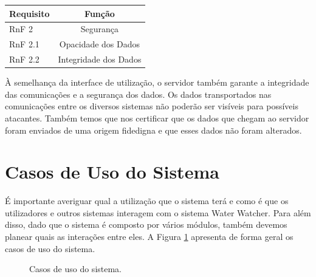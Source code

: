 \vspace{2cm}

\begin{center}
\begin{tabular}[c]{l c} 
\hline
Requisito & Função\\ %
\hline
RnF 2 & Segurança\\ 

RnF 2.1 & Opacidade dos Dados\\

RnF 2.2 & Integridade dos Dados\\
\hline
\end{tabular}
\label{tab:req_serv_n}
\end{center}
\vspace{8mm} %

À semelhança da interface de utilização, o servidor também garante a integridade das comunicações e a segurança dos dados. Os dados transportados nas comunicações entre os diversos sistemas não poderão ser visíveis para possíveis atacantes. Também temos que nos certificar que os dados que chegam ao servidor foram enviados de uma origem fidedigna e que esses dados não foram alterados.\\


\section{Casos de Uso do Sistema} \label{sec:casos_uso}
É importante averiguar qual a utilização que o sistema terá e como é que os utilizadores e outros sistemas interagem com o sistema Water Watcher. Para além disso, dado que o sistema é composto por vários módulos, também devemos planear quais as interações entre eles. A Figura \ref{fig:uso_sistema} apresenta de forma geral os casos de uso do sistema.

\begin{figure}[h!]
\begin{center}
\caption{Casos de uso do sistema.}
\label{fig:uso_sistema}
\end{center}
\end{figure}

